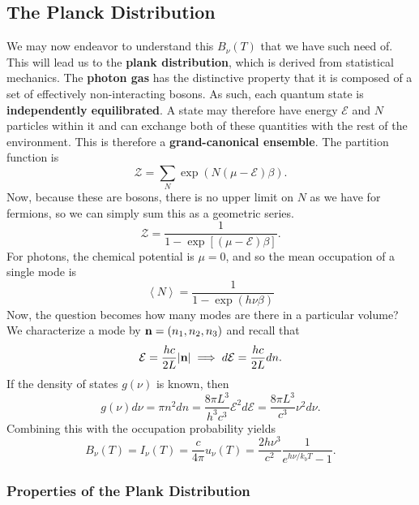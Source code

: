 \subsection{The Planck Distribution}
We may now endeavor to understand this $B_\nu(T)$ that we have such need of. This will lead us to the \textbf{plank distribution}, which is derived from statistical mechanics. The \textbf{photon gas} has the distinctive property that it is composed of a set of effectively non-interacting bosons. As such, each quantum state is \textbf{independently equilibrated}. A state may therefore have energy $\mathcal{E}$ and $N$ particles within it and can exchange both of these quantities with the rest of the environment. This is therefore a \textbf{grand-canonical ensemble}. The partition function is
\[
\mathcal{Z} = \sum_N \exp(N(\mu - \mathcal{E})\beta).
\]
Now, because these are bosons, there is no upper limit on $N$ as we have for fermions, so we can simply sum this as a geometric series.
\[
\mathcal{Z} = \frac{1}{1-\exp\left[(\mu - \mathcal{E})\beta\right]}.
\]
For photons, the chemical potential is $\mu = 0$, and so the mean occupation of a single mode is
\[
\left<N\right> = \frac{1}{1-\exp(h\nu \beta)}
\]
Now, the question becomes how many modes are there in a particular volume? We characterize a mode by ${\bf n} = (n_1,n_2,n_3)$ and recall that
\[
\mathcal{E} = \frac{hc}{2L} |{\bf n}| \implies d\mathcal{E} = \frac{hc}{2L} dn.
\]
If the density of states $g(\nu)$ is known, then 
\[
g(\nu) d \nu = \pi n^2 dn = \frac{8\pi L^3}{h^3c^3} \mathcal{E}^2 d\mathcal{E} = \frac{8\pi L^3}{c^3} \nu^2 d\nu.
\]
Combining this with the occupation probability yields
\begin{equation}
    \label{eq:bb_radiance}
    \boxed{
    B_\nu(T) = I_\nu(T) = \frac{c}{4\pi} u_\nu(T) = \frac{2 h \nu^3}{c^2} \frac{1}{e^{h\nu/k_bT} -1}.
}
\end{equation}
\subsubsection{Properties of the Plank Distribution}


